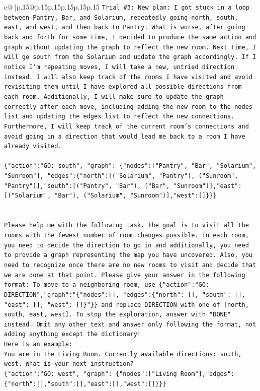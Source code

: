 \documentclass{article}
\begin{document}
{\begin{supertabular}{c@{$\;$}|p{.15\linewidth}@{}p{.15\linewidth}p{.15\linewidth}p{.15\linewidth}p{.15\linewidth}p{.15\linewidth}}
{{{\texttt{Trial \#3: New plan: I got stuck in a loop between Pantry, Bar, and Solarium, repeatedly going north, south, east, and west, and then back to Pantry. What is worse, after going back and forth for some time, I decided to produce the same action and graph without updating the graph to reflect the new room. Next time, I will go south from the Solarium and update the graph accordingly. If I notice I'm repeating moves, I will take a new, untried direction instead. I will also keep track of the rooms I have visited and avoid revisiting them until I have explored all possible directions from each room. Additionally, I will make sure to update the graph correctly after each move, including adding the new room to the nodes list and updating the edges list to reflect the new connections. Furthermore, I will keep track of the current room's connections and avoid going in a direction that would lead me back to a room I have already visited. } \\
\\ 
\texttt{\{"action":"GO: south", "graph": \{"nodes":{[}"Pantry", "Bar", "Solarium", "Sunroom"{]}, "edges":\{"north":{[}("Solarium", "Pantry"), ("Sunroom", "Pantry"){]},"south":{[}("Pantry", "Bar"), ("Bar", "Sunroom"){]},"east":{[}("Solarium", "Bar"), ("Solarium", "Sunroom"){]},"west":{[}{]}\}\}\}} \\
\\ 
\\ 
\texttt{Please help me with the following task. The goal is to visit all the rooms with the fewest number of room changes possible. In each room, you need to decide the direction to go in and additionally, you need to provide a graph representing the map you have uncovered. Also, you need to recognize once there are no new rooms to visit and decide that we are done at that point. Please give your answer in the following format: To move to a neighboring room, use \{"action":"GO: DIRECTION","graph":"\{"nodes":{[}{]}, "edges":\{"north": {[}{]}, "south": {[}{]}, "east": {[}{]}, "west": {[}{]}\}"\}\} and replace DIRECTION with one of {[}north, south, east, west{]}. To stop the exploration, answer with "DONE" instead. Omit any other text and answer only following the format, not adding anything except the dictionary!} \\
\texttt{Here is an example: } \\
\texttt{You are in the Living Room. Currently available directions: south, west. What is your next instruction?} \\
\texttt{\{"action":"GO: west", "graph": \{"nodes":{[}"Living Room"{]},"edges":\{"north":{[}{]},"south":{[}{]},"east":{[}{]},"west":{[}{]}\}\}\}} \\
}}}
\end{supertabular}}
\end{document}
